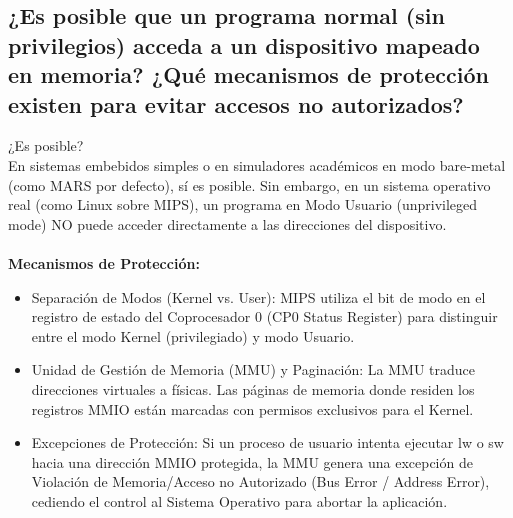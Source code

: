 \documentclass[12pt, a4paper]{article}
\begin{document}
\subsection{¿Es posible que un programa normal (sin privilegios) acceda a un dispositivo mapeado en memoria? ¿Qué mecanismos de protección existen para evitar accesos no autorizados?}
    ¿Es posible?\\
    En sistemas embebidos simples o en simuladores académicos en modo bare-metal (como MARS por defecto), sí es posible. Sin embargo, en un sistema operativo real (como Linux sobre MIPS), un programa en Modo Usuario (unprivileged mode) NO puede acceder directamente a las direcciones del dispositivo.\\\\
    \textbf{Mecanismos de Protección:}
    \begin{itemize}
        \item Separación de Modos (Kernel vs. User): MIPS utiliza el bit de modo en el registro de estado del Coprocesador 0 (CP0 Status Register) para distinguir entre el modo Kernel (privilegiado) y modo Usuario.
        \item Unidad de Gestión de Memoria (MMU) y Paginación: La MMU traduce direcciones virtuales a físicas. Las páginas de memoria donde residen los registros MMIO están marcadas con permisos exclusivos para el Kernel.
        \item Excepciones de Protección: Si un proceso de usuario intenta ejecutar lw o sw hacia una dirección MMIO protegida, la MMU genera una excepción de Violación de Memoria/Acceso no Autorizado (Bus Error / Address Error), cediendo el control al Sistema Operativo para abortar la aplicación.
    \end{itemize}
    
\end{document}
